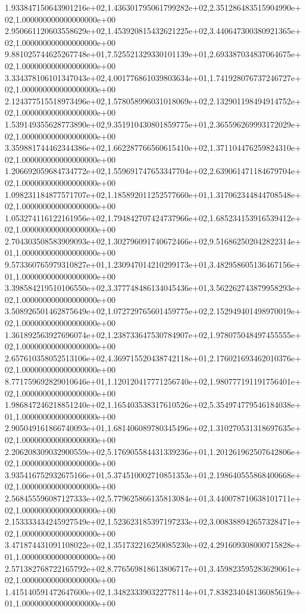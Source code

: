 1.933847150643901216e+02,1.436301795061799282e+02,2.351286483515904990e+02,1.000000000000000000e+00
2.950661120603558629e+02,1.453920815432621225e+02,3.440647300380921365e+02,1.000000000000000000e+00
9.881025744625267748e+01,7.525521329330101139e+01,2.693387034837064675e+02,1.000000000000000000e+00
3.334378106101347043e+02,4.001776861039803634e+01,1.741928076737246727e+02,1.000000000000000000e+00
2.124377515518973496e+02,1.578058996031018069e+02,2.132901198494914752e+02,1.000000000000000000e+00
1.539149355628773890e+02,9.351910430801859775e+01,2.365596269993172029e+02,1.000000000000000000e+00
3.359881744462344386e+02,1.662287766560615410e+02,1.371104476259824310e+02,1.000000000000000000e+00
1.206692059684734772e+02,1.559691747653347704e+02,2.639061471184679704e+02,1.000000000000000000e+00
1.098231184877571707e+02,1.185892011252577660e+01,1.317062344844708548e+02,1.000000000000000000e+00
1.053274116122161956e+02,1.794842707424737966e+02,1.685234153916539412e+02,1.000000000000000000e+00
2.704303508583909093e+02,1.302796091740672466e+02,9.516862502042822314e+01,1.000000000000000000e+00
9.573360765979310827e+01,1.230947014210299173e+01,3.482958605136467156e+01,1.000000000000000000e+00
3.398584219510106550e+02,3.377748486134045436e+01,3.562262743879958293e+02,1.000000000000000000e+00
3.508926501462875649e+02,1.072729765601459775e+02,2.152949401498970019e+02,1.000000000000000000e+00
1.361892563927696074e+02,1.238733647530784907e+02,1.978075048497455555e+02,1.000000000000000000e+00
2.657610358052513106e+02,4.369715520438742118e+01,2.176021693462010376e+02,1.000000000000000000e+00
8.771759692829010646e+01,1.120120417771256740e+02,1.980777191191756401e+02,1.000000000000000000e+00
1.986847246218851240e+02,1.165403538317610526e+02,5.354974779546184038e+01,1.000000000000000000e+00
2.905049161866740093e+01,1.681406089780345496e+02,1.310270531318697635e+02,1.000000000000000000e+00
2.206208309032900559e+02,5.176905584431339236e+01,1.201261962507642806e+02,1.000000000000000000e+00
3.935416752932675166e+01,5.374510002710851353e+01,2.198640555868400668e+02,1.000000000000000000e+00
2.568455596087127333e+02,5.779625866135813084e+01,3.440078710638101711e+02,1.000000000000000000e+00
2.153333434245927549e+02,1.523623185397197233e+02,3.008388942657328471e+02,1.000000000000000000e+00
3.471874431091108022e+02,1.351732216250085230e+02,4.291609308000715828e+01,1.000000000000000000e+00
2.571382768722165792e+02,8.776569818613806717e+01,3.459823595283629061e+02,1.000000000000000000e+00
1.415140591472647600e+02,1.348233390322778114e+01,7.838234048136085619e+01,1.000000000000000000e+00
